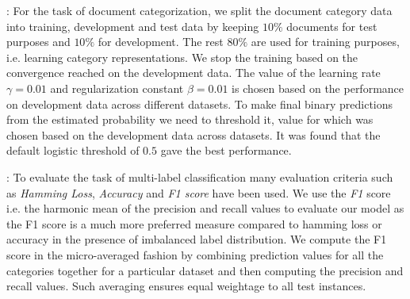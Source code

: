  : For the task of document categorization, we split the document category data into training, development and test data by keeping $10\%$ documents for test purposes and $10\%$ for development. The rest $80\%$ are used for training purposes, i.e. learning category representations. We stop the training based on the convergence reached on the development data. The value of the learning rate $\gamma = 0.01$ and regularization constant $\beta = 0.01$ is chosen based on the performance on development data across different datasets. To make final binary predictions from the estimated probability we need to threshold it, value for which was chosen based on the development data across datasets. It was found that the default logistic threshold of $0.5$ gave the best performance.

 : To evaluate the task of multi-label classification many evaluation criteria such as \emph{Hamming Loss}, \emph{Accuracy} and \emph{F1 score} have been used. We use the \emph{F1} score i.e. the harmonic mean of the precision and recall values to evaluate our model as the F1 score is a much more preferred measure compared to hamming loss or accuracy in the presence of imbalanced label distribution. We compute the F1 score in the micro-averaged fashion by combining prediction values for all the categories together for a particular dataset and then computing the precision and recall values. 
Such averaging ensures equal weightage to all test instances.

